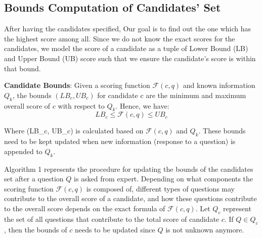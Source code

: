 

\subsection{Bounds Computation of Candidates' Set}
\label{bound_computation}

After having the candidates specified, Our goal is to find out the one which has the highest score among all. Since we do not know the exact scores for the candidates, we model the score of a candidate as a tuple of Lower Bound (LB) and Upper Bound (UB) score such that we ensure the candidate's score is within that bound. 

\begin{definition}
    \textbf{Candidate Bounds}: Given a scoring function $\mathcal{F}(c, q)$ and known information $Q_k$, the bounds $(LB_c, UB_c)$ for candidate c are the minimum and maximum overall score of $c$ with respect to $Q_k$. Hence, we have:
    \[
    LB_c \leq \mathcal{F}(c, q) \leq UB_c
    \]
\end{definition}


Where (LB\_c, UB\_c) is calculated based on $\mathcal{F}(c, q)$ and $Q_k$. These bounds need to be kept updated when new information (response to a question) is appended to $Q_k$. 

\begin{comment}

\begin{definition}[Candidates Set Bounds]
\label{candidate_set} Given a scoring function $\mathcal{F}$ and n candidates, candidates set Bounds represent the score bounds for each candidate at a point in time. candidates set Bounds (C) can be represented as follows:

\[
\text{C} = \{ c_1:(\text{LB}_{c_1}, \text{UB}_{c_1}), c_2: (\text{LB}_{c_2}, \text{UB}_{c_2}), \ldots, c_n:(\text{LB}_{c_n}, \text{UB}_{c_n}) \}
\] 
\end{definition}

After each question from the LLM, the bounds for the candidates need to be updated. 
\end{comment}
Algorithm 1 represents the procedure for updating the bounds of the candidates set after a question $Q$ is asked from expert. Depending on what components the scoring function \( \mathcal{F}(c, q) \) is composed of, different types of questions may contribute to the overall score of a candidate, and how these questions contribute to the overall score depends on the exact formula of \( \mathcal{F}(c, q) \). Let \( Q_c \) represent the set of all questions that contribute to the total score of candidate \( c \). If $Q \in Q_c$, then the bounds of $c$ needs to be updated since $Q$ is not unknown anymore. 

